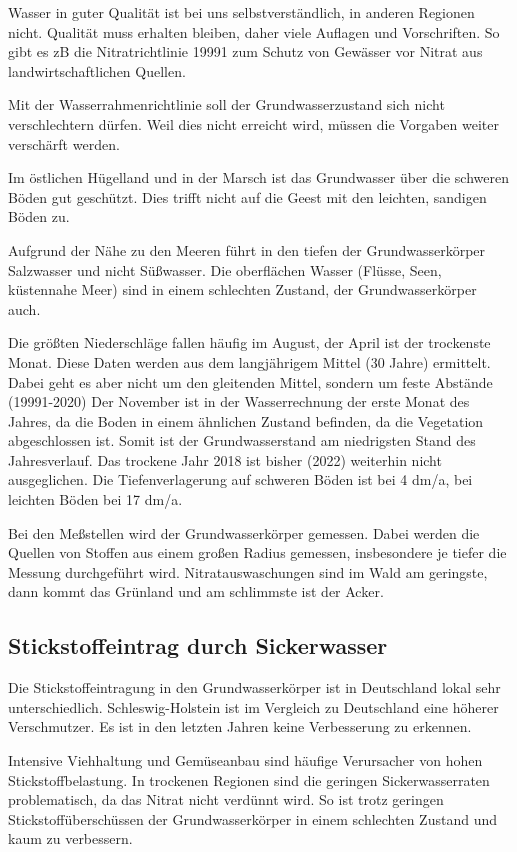 \documentclass[11pt]{scrbook}
\begin{document}
Wasser in guter Qualität ist bei uns selbstverständlich, in anderen Regionen nicht.
Qualität muss erhalten bleiben, daher viele Auflagen und Vorschriften.
So gibt es zB die Nitratrichtlinie 19991 zum Schutz von Gewässer vor Nitrat aus landwirtschaftlichen Quellen.

Mit der Wasserrahmenrichtlinie soll der Grundwasserzustand sich nicht verschlechtern dürfen.
Weil dies nicht erreicht wird, müssen die Vorgaben weiter verschärft werden.

Im östlichen Hügelland und in der Marsch ist das Grundwasser über die schweren Böden gut geschützt.
Dies trifft nicht auf die Geest mit den leichten, sandigen Böden zu.

Aufgrund der Nähe zu den Meeren führt in den tiefen der Grundwasserkörper Salzwasser und nicht Süßwasser.
Die oberflächen Wasser (Flüsse, Seen, küstennahe Meer) sind in einem schlechten Zustand, der Grundwasserkörper auch.

Die größten Niederschläge fallen häufig im August, der April ist der trockenste Monat.
Diese Daten werden aus dem langjährigem Mittel (30 Jahre) ermittelt.
Dabei geht es aber nicht um den gleitenden Mittel, sondern um feste Abstände (19991-2020)
Der November ist in der Wasserrechnung der erste Monat des Jahres, da die Boden in einem ähnlichen Zustand befinden, da die Vegetation abgeschlossen ist.
Somit ist der Grundwasserstand am niedrigsten Stand des Jahresverlauf.
Das trockene Jahr 2018 ist bisher (2022) weiterhin nicht ausgeglichen.
Die Tiefenverlagerung auf schweren Böden ist bei 4 dm/a, bei leichten Böden bei 17 dm/a.

Bei den Meßstellen wird der Grundwasserkörper gemessen.
Dabei werden die Quellen von Stoffen aus einem großen Radius gemessen, insbesondere je tiefer die Messung durchgeführt wird.
Nitratauswaschungen sind im Wald am geringste, dann kommt das Grünland und am \glqq schlimmste\grqq{} ist der Acker.

\subsection{Stickstoffeintrag durch Sickerwasser}
Die Stickstoffeintragung in den Grundwasserkörper ist in Deutschland lokal sehr unterschiedlich.
Schleswig-Holstein ist im Vergleich zu Deutschland eine höherer Verschmutzer.
Es ist in den letzten Jahren keine Verbesserung zu erkennen.

Intensive Viehhaltung und Gemüseanbau sind häufige Verursacher von hohen Stickstoffbelastung.
In trockenen Regionen sind die geringen Sickerwasserraten problematisch, da das Nitrat nicht verdünnt wird.
So ist trotz geringen Stickstoffüberschüssen der Grundwasserkörper in einem schlechten Zustand und kaum zu verbessern.
\end{document}
